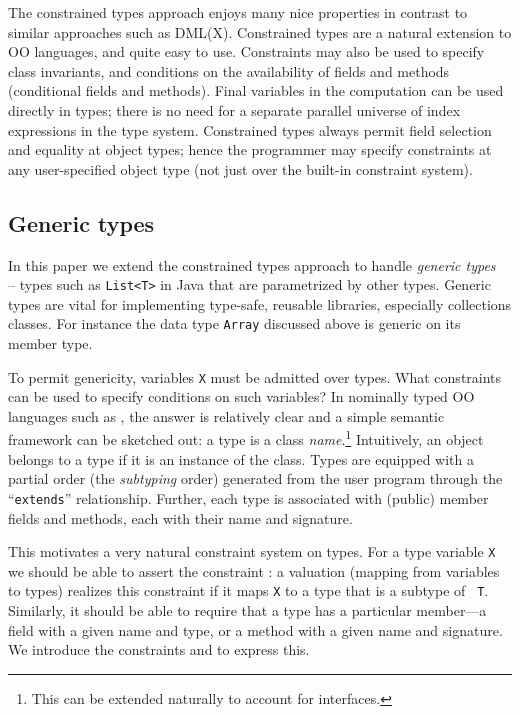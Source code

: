 The constrained types approach enjoys many nice properties in contrast
to similar approaches such as DML(X)\cite{xi99dependent}.  Constrained
types are a natural extension to OO languages, and quite easy to
use. Constraints may also be used to specify class invariants, and
conditions on the availability of fields and methods (conditional
fields and methods).  Final variables in the computation can be used
directly in types; there is no need for a separate parallel universe
of index expressions in the type system.  Constrained types always
permit field selection and equality at object types; hence the
programmer may specify constraints at any user-specified object type
(not just over the built-in constraint system).  


\subsection{Generic types}

In this paper we extend the constrained types approach to handle {\em
generic
types}~\cite{clu,ada,GJ,java-popl97,thorup97,Java3,csharp-generics} --
types such as {\tt List<T>} in Java that are parametrized by other
types. Generic types are vital for implementing type-safe, reusable
libraries, especially collections classes. For instance the data type
{\tt Array} discussed above is generic on its member type.

To permit genericity, variables {\tt X} must be admitted over types.
What constraints can be used to specify conditions on such variables?
In nominally typed OO languages such as \Java, the answer is
relatively clear and a simple semantic framework can be sketched out:
a type is a class {\em name}.\footnote{This can be extended naturally
to account for interfaces.} Intuitively, an object belongs to a type
if it is an instance of the class. Types are equipped with a partial
order (the {\em subtyping} order) generated from the user program
through the ``{\tt extends}'' relationship.  Further, each type is
associated with (public) member fields and methods, each with their
name and signature.
%

This motivates a very natural constraint system on types.  For a type
variable {\tt X} we should be able to assert the constraint 
\subtype {}: a valuation (mapping from variables to types) realizes
this constraint if it maps {\tt X} to a type that is a subtype of {\tt
T}. Similarly, it should be able to require that a type has a
particular member---a field with a given name and type, or a method
with a given name and signature. We introduce the constraints 
 and  to express this.


